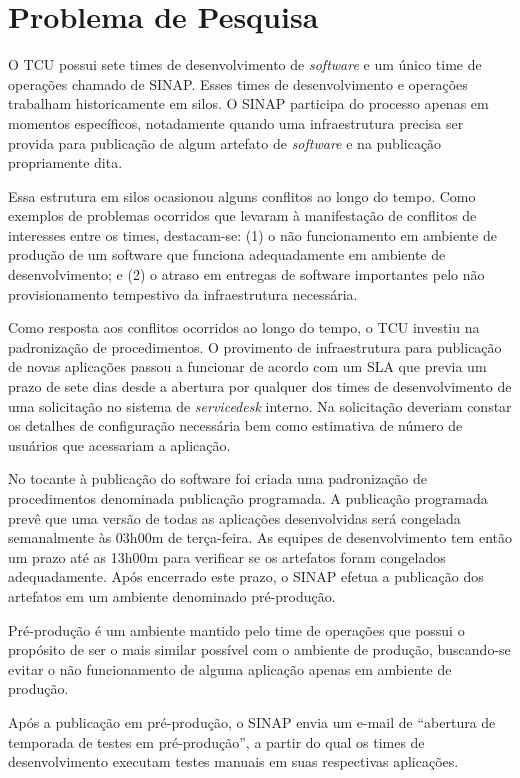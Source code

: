 \section{Problema de Pesquisa}%
O \acrshort{TCU} possui sete times de desenvolvimento de \textit{software} e um
único time de operações chamado de \acrfull{SINAP}. Esses times de
desenvolvimento e operações trabalham historicamente em silos.
O \acrshort{SINAP} participa do processo apenas em
momentos específicos, notadamente quando uma infraestrutura precisa ser provida
para publicação de algum artefato de \textit{software} e na publicação
propriamente dita.

Essa estrutura em silos ocasionou alguns conflitos ao longo do tempo. Como
exemplos de problemas ocorridos que levaram à manifestação
de conflitos de interesses entre os times, destacam-se: (1) o não
funcionamento em ambiente de produção de um software que funciona adequadamente
em ambiente de desenvolvimento; e (2) o atraso em entregas de software
importantes pelo não provisionamento tempestivo da infraestrutura necessária.

Como resposta aos conflitos ocorridos ao longo do tempo, o \acrshort{TCU}
investiu na padronização de procedimentos. O provimento de infraestrutura
para publicação de novas aplicações passou a funcionar de acordo com um
\acrfull{SLA} que previa um prazo de sete dias desde a abertura por qualquer
dos times de desenvolvimento de uma solicitação no sistema de
\textit{servicedesk} interno. Na solicitação deveriam constar os detalhes
de configuração necessária bem como estimativa de número de usuários que
acessariam a aplicação.

No tocante à publicação do software foi criada uma padronização de
procedimentos denominada publicação programada. A publicação programada prevê
que uma versão de todas as aplicações desenvolvidas será congelada semanalmente
às 03h00m de terça-feira. As equipes de desenvolvimento tem então um prazo até
as 13h00m para verificar se os artefatos foram congelados adequadamente. Após
encerrado este prazo, o \acrshort{SINAP} efetua a publicação dos artefatos
em um ambiente denominado pré-produção.

Pré-produção é um ambiente mantido pelo time de operações que possui o
propósito de ser o mais similar possível com o ambiente de produção, buscando-se
evitar o não funcionamento de alguma aplicação apenas em ambiente de produção.

Após a publicação em pré-produção, o \acrshort{SINAP} envia um e-mail de
``abertura de temporada de testes em pré-produção'', a partir do qual os times
de desenvolvimento executam testes manuais em suas respectivas aplicações.

